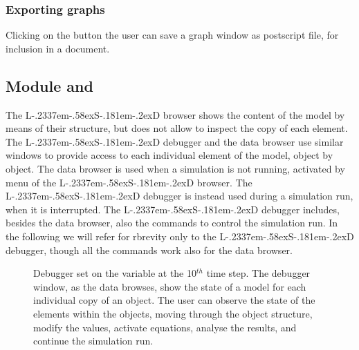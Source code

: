 \documentclass [11pt,a4paper] {book}
\def\LsD{{L\kern-.2337em\lower-.58ex\hbox{S}\kern-.181em\lower-.2ex\hbox{D}}\xspace}
\begin{document}
\subsubsection{Exporting graphs}
Clicking on the button  the user can save a graph window as postscript file, for inclusion in a document. 


\subsection{Module \menu{\LsD Debugger} and }

The \LsD browser shows the content of the model by means of their structure, but does not allow to inspect the copy of each element. The \LsD debugger and the data browser use similar windows to provide access to each individual element of the model, object by object. The data browser is used when a simulation is not running, activated by menu  of the \LsD browser. The \LsD debugger is instead used during a simulation run, when it is interrupted. The \LsD debugger includes, besides the data browser, also the commands to control the simulation run. In the following we will refer for rbrevity only to the \LsD debugger, though all the commands work also for the data browser.


\begin{figure}[ht]
  \centering
  \caption{\small Debugger set on the variable  at the 10$^{th}$ time step. The debugger window, as the data browses, show the state of a model for each individual copy of an object. The user can observe the state of the elements within the objects, moving through the object structure, modify the values, activate equations, analyse the results, and continue the simulation run.}
  \label{fig:debugger2}
\end{figure}
\end{document}
